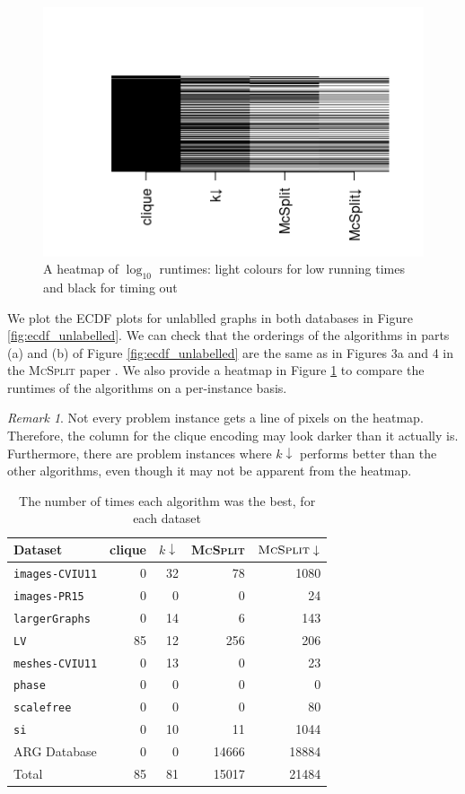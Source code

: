 \documentclass{l4proj}
\theoremstyle{definition}
\theoremstyle{remark}
\newtheorem{remark}{Remark}[section]
\begin{document}
\begin{figure}
  \centering
  \includegraphics{images/runtime_heatmap.png}
  \caption{A heatmap of $\log_{10}$ runtimes: light colours for low running
    times and black for timing out}
  \label{fig:runtime_heatmap}
\end{figure}

We plot the ECDF plots for unlablled graphs in both databases in Figure \ref{fig:ecdf_unlabelled}. We can check that the orderings of the algorithms in parts (a) and (b) of Figure \ref{fig:ecdf_unlabelled} are the same as in Figures 3a and 4 in the \textsc{McSplit} paper \cite{DBLP:conf/ijcai/McCreeshPT17}. We also provide a heatmap in Figure \ref{fig:runtime_heatmap} to compare the runtimes of the algorithms on a per-instance basis.

\begin{remark}
  Not every problem instance gets a line of pixels on the heatmap. Therefore,
  the column for the clique encoding may look darker than it actually is.
  Furthermore, there are problem instances where $k\downarrow$ performs better
  than the other algorithms, even though it may not be apparent from the heatmap.
\end{remark}

\begin{table}
  \centering
  \begin{tabular}{l r r r r}
    Dataset & clique & $k\downarrow$ & \textsc{McSplit} & $\textsc{McSplit}\downarrow$ \\
    \hline
    \texttt{images-CVIU11} & 0 & 32 & 78 & 1080 \\
    \texttt{images-PR15} & 0 & 0 & 0 & 24 \\
    \texttt{largerGraphs} & 0 & 14 & 6 & 143 \\
    \texttt{LV} & 85 & 12 & 256 & 206 \\
    \texttt{meshes-CVIU11} & 0 & 13 & 0 & 23 \\
    \texttt{phase} & 0 & 0 & 0 & 0 \\
    \texttt{scalefree} & 0 & 0 & 0 & 80 \\
    \texttt{si} & 0 & 10 & 11 & 1044 \\
    ARG Database & 0 & 0 & 14666 & 18884 \\
    \hline
    Total & 85 & 81 & 15017 & 21484
  \end{tabular}
  \caption{The number of times each algorithm was the best, for each dataset}
  \label{table:best}
\end{table}
\end{document}
